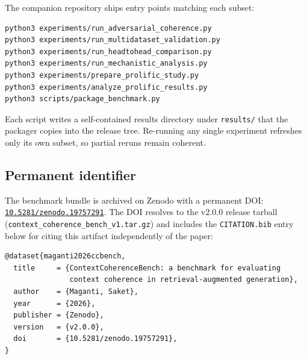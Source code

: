 The companion repository ships entry points matching each subset:

\begin{verbatim}
python3 experiments/run_adversarial_coherence.py
python3 experiments/run_multidataset_validation.py
python3 experiments/run_headtohead_comparison.py
python3 experiments/run_mechanistic_analysis.py
python3 experiments/prepare_prolific_study.py
python3 experiments/analyze_prolific_results.py
python3 scripts/package_benchmark.py
\end{verbatim}

Each script writes a self-contained results directory under
\texttt{results/} that the packager copies into the release tree. Re-running
any single experiment refreshes only its own subset, so partial reruns
remain coherent.

\subsection{Permanent identifier}

The benchmark bundle is archived on Zenodo with a permanent DOI:
\href{https://doi.org/10.5281/zenodo.19757291}
     {\texttt{10.5281/zenodo.19757291}}.
The DOI resolves to the v$2.0.0$ release tarball
(\texttt{context\_coherence\_bench\_v1.tar.gz}) and includes the
\texttt{CITATION.bib} entry below for citing this artifact independently
of the paper:

\begin{verbatim}
@dataset{maganti2026ccbench,
  title     = {ContextCoherenceBench: a benchmark for evaluating
               context coherence in retrieval-augmented generation},
  author    = {Maganti, Saket},
  year      = {2026},
  publisher = {Zenodo},
  version   = {v2.0.0},
  doi       = {10.5281/zenodo.19757291},
}
\end{verbatim}

